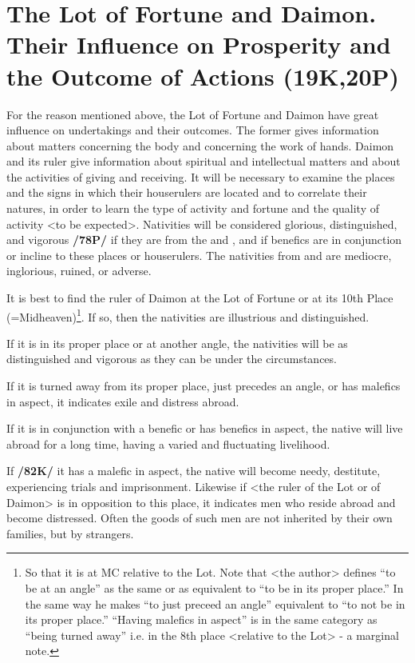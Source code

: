 \section{The Lot of Fortune and Daimon. Their Influence on Prosperity and the Outcome of Actions (19K,20P)}

For the reason mentioned above, the Lot of Fortune and Daimon have great influence on undertakings and their outcomes. The former gives information about matters concerning the body and concerning the work of hands. Daimon and its ruler give information about spiritual and intellectual matters and about the activities of giving and receiving. It will be necessary to examine the places and the signs in which their houserulers are located and to correlate their natures, in order to learn the type of activity and fortune and the quality of activity <to be expected>. Nativities will be considered glorious, distinguished, and vigorous \textbf{/78P/} if they are from the \Sun\xspace and \Moon, and if benefics are in conjunction or incline to these places or houserulers. The nativities from \Saturn\xspace and \Mars\xspace are mediocre, inglorious, ruined, or adverse. 

It is best to find the ruler of Daimon at the Lot of Fortune or at its 10th Place (=Midheaven)\footnote{So that it is at MC relative to the Lot. Note that <the author> defines “to be at an angle” as the same or as equivalent to “to be in its proper place.” In the same way he makes “to just preceed an angle” equivalent to “to not be in its proper place.” “Having malefics in aspect” is in the same category as “being turned away” i.e. in the 8th place <relative to the Lot> - a marginal note.}. If so, then the nativities are illustrious and
distinguished. 

If it is in its proper place or at another angle, the nativities will be as distinguished and vigorous as they can be under the circumstances. 

If it is turned away from its proper place, just precedes an angle, or has malefics in aspect, it indicates exile and distress abroad. 

If it is in conjunction with a benefic or has benefics in aspect, the native will live abroad for a long time, having a varied and fluctuating livelihood. 

If \textbf{/82K/} it has a malefic in aspect, the native will become needy, destitute, experiencing trials and imprisonment. Likewise if <the ruler of the Lot or of Daimon> is in opposition to this place, it indicates men who reside abroad and become distressed. Often the goods of such men are not inherited by their own families, but by strangers.

\newpage